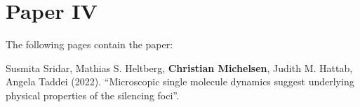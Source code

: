 
\chapter{Paper IV}
\label{chapter:diffusion}

The following pages contain the paper:
\vspace*{1cm}


Susmita Sridar, Mathias S. Heltberg, \textbf{Christian Michelsen}, Judith M. Hattab, Angela Taddei (2022). ``Microscopic single molecule dynamics suggest underlying physical properties of the silencing foci''.

\clearpage
